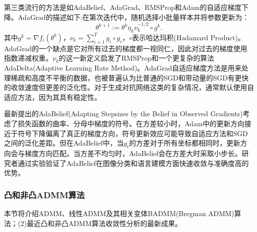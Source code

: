 第三类流行的方法是如AdaBelief、AdaGrad、RMSProp和Adam的自适应梯度下降\supercite{Liu,Xiangyi}。AdaGrad的描述如下:在第次迭代中，随机选择小批量样本并将参数更新为：
\begin{equation} \label{method:2-5}
	\theta^{k+1}:=\theta^k\eta_k\nu_k^{-1/2}\circ{g^k}.
\end{equation}
其中$g^k=\nabla{f_i(\theta^k)}$，$\nu_k=\sum_{i=1}^{T}g_i\circ{g_i}$，$\circ$表示哈达玛积(Hadamard Product)。AdaGrad的一个缺点是它对所有过去的梯度都一视同仁，因此对过去的梯度使用指数递减权重。$\nu_k$的这一新定义启发了RMSProp和一个更复杂的算法AdaDelta(Adaptive Learning Rate Method)。AdaGrad自适应梯度方法是用来处理稀疏和高度不平衡的数据，也被普遍认为比普通的SGD和带动量的SGD有更快的收敛速度但更差的泛化性。对于生成对抗网络这类的复杂情况，通常默认使用自适应方法，因为其具有稳定性\supercite{Ruoyu,Dongruo,Xiangyi}。

最新提出的AdaBelief(Adapting Stepsizes by the Belief in Observed Gradients)考虑了损失函数的曲率、分母中梯度的符号。在方差较小时，Adam中的更新方向接近于符号下降偏离了真正的梯度方向，符号更新效应可能导致自适应方法和SGD之间的泛化差距\supercite{Dongruo}。但在AdaBelief中，当$g_t$的方差对于所有坐标都相同时，更新方向会与梯度方向匹配。当方差不均匀时，AdaBelief会在方差大时采取小步长。研究者通过实验验证了AdaBelief在图像分类和语言建模方面快速收敛与准确度高的优势。


\subsubsection{凸和非凸ADMM算法}
本节将介绍ADMM、线性ADMM及其相关变体BADMM(Bregman ADMM)算法；(2)最近凸和非凸ADMM算法收敛性分析的最新成果。

